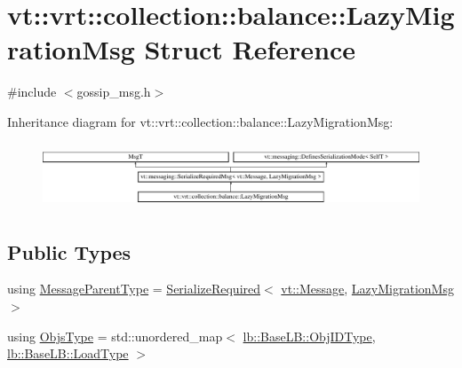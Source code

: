 \hypertarget{structvt_1_1vrt_1_1collection_1_1balance_1_1_lazy_migration_msg}{}\section{vt\+:\+:vrt\+:\+:collection\+:\+:balance\+:\+:Lazy\+Migration\+Msg Struct Reference}
\label{structvt_1_1vrt_1_1collection_1_1balance_1_1_lazy_migration_msg}


{\ttfamily \#include $<$gossip\+\_\+msg.\+h$>$}

Inheritance diagram for vt\+:\+:vrt\+:\+:collection\+:\+:balance\+:\+:Lazy\+Migration\+Msg\+:\begin{figure}[H]
\begin{center}
\leavevmode
\includegraphics[height=1.962617cm]{structvt_1_1vrt_1_1collection_1_1balance_1_1_lazy_migration_msg}
\end{center}
\end{figure}
\subsection*{Public Types}
\begin{DoxyCompactItemize}
\item 
using \hyperlink{structvt_1_1vrt_1_1collection_1_1balance_1_1_lazy_migration_msg_ae85922f15b423b53083cccda06ef0b45}{Message\+Parent\+Type} = \hyperlink{namespacevt_a9e60e2e8929828639383ac1d6643384d}{Serialize\+Required}$<$ \hyperlink{namespacevt_a3a3ddfef40b4c90915fa43cdd5f129ea}{vt\+::\+Message}, \hyperlink{structvt_1_1vrt_1_1collection_1_1balance_1_1_lazy_migration_msg}{Lazy\+Migration\+Msg} $>$
\item 
using \hyperlink{structvt_1_1vrt_1_1collection_1_1balance_1_1_lazy_migration_msg_a8d71e0015ee1e05da54701cae56ef31c}{Objs\+Type} = std\+::unordered\+\_\+map$<$ \hyperlink{structvt_1_1vrt_1_1collection_1_1lb_1_1_base_l_b_a15a2f756b59c8c2437985206b32aa403}{lb\+::\+Base\+L\+B\+::\+Obj\+I\+D\+Type}, \hyperlink{structvt_1_1vrt_1_1collection_1_1lb_1_1_base_l_b_a215e22b9f12678303f49615ae3be05cc}{lb\+::\+Base\+L\+B\+::\+Load\+Type} $>$
\end{DoxyCompactItemize}
